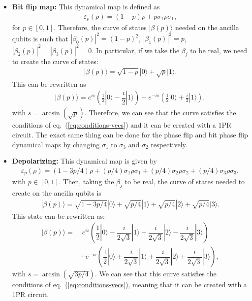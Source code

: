 \documentclass[10pt,letterpaper]{article} %
\newcommand{\eref}[1]{eq.~(\ref{#1})}
\begin{document}
\begin{itemize}
\item \textbf{Bit flip map:} 
This dynamical map is defined as
\begin{align*}
\varepsilon_p(\rho) = (1-p)\rho + p\sigma_1 \rho \sigma_1,
\end{align*}
for $p \in [0,1]$. 
Therefore, the curve of states $|\beta(p)\rangle$ needed on the ancilla
qubits is such that 
$|\beta_0(p)|^2= (1-p)^2$, $|\beta_1(p)|^2 = p$, $|\beta_2(p)|^2 = |\beta_3(p)|^2 = 0$.
In particular, if we take the $\beta_j$ to be real,
we need to create the curve of states:
\begin{align*}
|\beta(p)\rangle = \sqrt{1-p} |0\rangle +\sqrt{p} |1\rangle.
\end{align*}
This can be rewritten as
\begin{align*}
|\beta(p) \rangle = e^{is}  \left(\frac{1}{2} |0\rangle - \dfrac{i}{2} |1\rangle \right) + e^{-is} \left( \frac{1}{2} |0\rangle + \frac{i}{2} |1\rangle \right),
\end{align*}
with $s= \arcsin(\sqrt{p})$.
Therefore, we can see that the curve satisfies the conditions of  \eref{eq:conditions-vecs} 
and it can be created with a 1PR circuit.
The exact same thing can be done
for the phase flip and bit phase flip dynamical maps by
changing $\sigma_1$ to
$\sigma_3$ and $\sigma_2$ respectively.

\item \textbf{Depolarizing:} This dynamical map is given by
\begin{align*}
\varepsilon_p(\rho) = (1-3p/4) \rho + (p/4) \sigma_1 \rho \sigma_1 + (p/4) \sigma_2 \rho \sigma_2 + (p/4) \sigma_3 \rho \sigma_3,
\end{align*}
with $p \in [0,1]$. 
Then, taking the $\beta_j$ to be real,
the curve of states needed to create on the ancilla qubits is
\begin{align*}
|\beta(p) \rangle = \sqrt{1-3p/4} |0\rangle + \sqrt{p/4} |1\rangle + \sqrt{p/4} |2 \rangle  + \sqrt{p/4} |3\rangle.
\end{align*}
This state can be rewritten as:
\begin{align*}
|\beta(p)\rangle =& \; e^{is} \left( \dfrac{1}{2} |0\rangle - \dfrac{i}{2\sqrt{3}} |1\rangle - \dfrac{i}{2\sqrt{3}} |2 \rangle - \dfrac{i}{2\sqrt{3}} |3\rangle \right) \\
& + e^{-is} \left( \dfrac{1}{2} |0\rangle + \dfrac{i}{2\sqrt{3}} |1\rangle + \dfrac{i}{2\sqrt{3}} |2\rangle + \dfrac{i}{2\sqrt{3}} |3 \rangle \right),
\end{align*}
with $s = \arcsin(\sqrt{3p/4})$.
We can see that this curve satisfies the conditions of \eref{eq:conditions-vecs}, meaning that it can be created with a 
1PR circuit.


\end{itemize}
\end{document}
